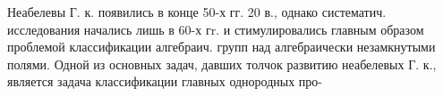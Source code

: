 \documentclass[10pt]{article}
\begin{document}
Неабелевы Г. к. появились в конце 50-х гг. 20 в., однако систематич. исследования начались лишь в 60-х гr. и стимулировались главным образом проблемой классификации алгебраич. групп над алгебраически незамкнутыми полями. Одной из основных задач, давших толчок развитию неабелевых Г. к., является задача классификации главных однородных про-
\end{document}
